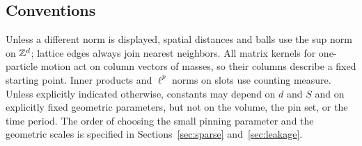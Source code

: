 \subsection{Conventions}

Unless a different norm is displayed, spatial distances and balls use
the sup norm on $\mathbb Z^d$; lattice edges always join nearest neighbors.
All matrix kernels for one-particle motion act on column vectors of
masses, so their columns describe a fixed starting point.
Inner products and $\ell^p$ norms on slots use counting measure.
Unless explicitly indicated otherwise, constants may depend on $d$ and $S$
and on explicitly fixed geometric
parameters, but not on the volume, the pin set, or the time period.
The order of choosing the small pinning parameter and the geometric
scales is specified in Sections~\ref{sec:sparse} and~\ref{sec:leakage}.
